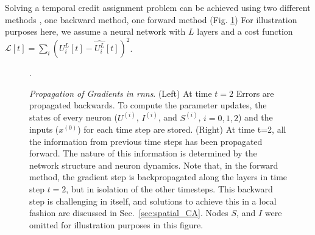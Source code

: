 \documentclass[journal,onecolumn,11pt]{IEEEtran}
\begin{document}
\label{sec:temporal_credit_assignment}
Solving a temporal credit assignment problem can be achieved using two different methods \cite{Williams_Zipser89_learalgo}, one backward method, one forward method (Fig. \ref{fig:backwrd_vs_forward_prop})
For illustration purposes here, we assume a neural network with $L$ layers and a cost function $\mathcal{L}[t] = \sum_i (U^{L}_i[t]-\hat{U^{L}_i}[t])^2$. 
%
\begin{figure}[htbp]
    \centering
  \caption{\emph{Propagation of Gradients in \Glspl{rnn}}. (Left) At time $t=2$ Errors are propagated backwards. To compute the parameter updates, the states of every neuron ($U^{(i)}$, $I^{(i)}$, and $S^{(i)}$, $i=0,1,2$) and the inputs ($x^{(0)}$) for each time step are stored. (Right) At time t=2, all the information from previous time steps has been propagated forward. The nature of this information is determined by the network structure and neuron dynamics. Note that, in the forward method, the gradient step is backpropagated along the layers in time step $t=2$, but in isolation of the other timesteps. This backward step is challenging in itself, and solutions to achieve this in a local fashion are discussed in Sec.~\ref{sec:spatial_CA}. Nodes $S$, and $I$ were omitted for illustration purposes in this figure.
}. 
    \label{fig:backwrd_vs_forward_prop}
\end{figure}
%
\end{document}
